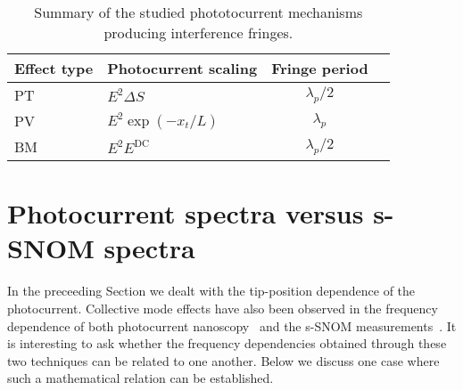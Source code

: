 \documentclass[aps, prb, reprint, superscriptaddress]{revtex4-2}
\begin{document}
\begin{table}[bth]
	\begin{ruledtabular}
		\begin{tabular}{llcc}
			Effect type & Photocurrent scaling & Fringe period
			\\
			\hline 
			PT & $E^2 \Delta S$  &  $\lambda_p / 2$
			\\[3pt]
			PV & $E^2 \exp(-x_t / L)$  &  $\lambda_p$
			\\[3pt]
			BM & $E^2 E^{\mathrm{DC}}$  &  $\lambda_p / 2$
		\end{tabular}
	\end{ruledtabular}
	\caption{
		Summary of the studied phototocurrent mechanisms producing interference fringes.
	}
	\label{tbl:overview} 
\end{table}

\section{Photocurrent spectra versus \lowercase{s}-SNOM spectra}
\label{sec:frequency} 

In the preceeding Section we dealt with the tip-position dependence of the photocurrent.
Collective mode effects have also been observed in the frequency dependence of
both photocurrent nanoscopy~\cite{Koppens_2014} and the s-SNOM measurements~\cite{Fei2011}. 
It is interesting to ask whether the frequency dependencies obtained through these two techniques can be related to one another. 
Below we discuss one case where such a mathematical relation can be established.
\end{document}
